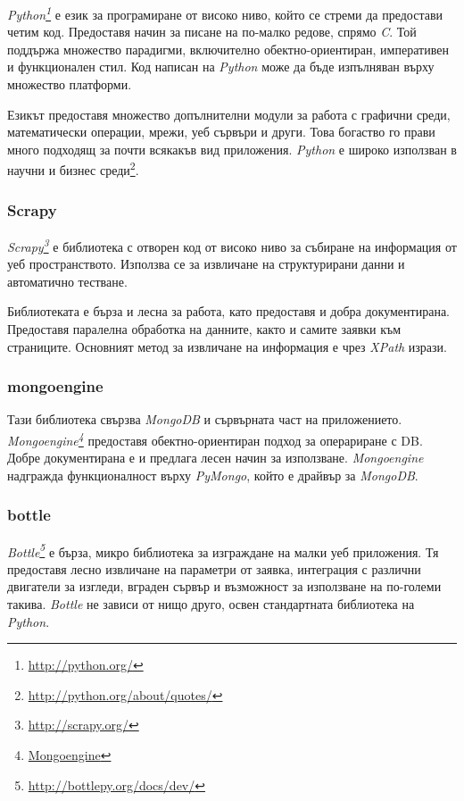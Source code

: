 		\emph{Python\footnote{\url{http://python.org/}}} е език за програмиране от високо ниво, който се стреми да предостави четим код. Предоставя начин за писане на по-малко редове, спрямо \emph{C}. Той поддържа множество парадигми, включително обектно-ориентиран, императивен и функционален стил. Код написан на \emph{Python} може да бъде изпълняван върху множество платформи. 
		
		Езикът предоставя множество допълнителни модули за работа с графични среди, математически операции, мрежи, уеб сървъри и други. Това богаство го прави много подходящ за почти всякакъв вид приложения. \emph{Python} е широко използван в научни и бизнес среди\footnote{\url{http://python.org/about/quotes/}}.
		
		\subsubsection{Scrapy}

		\emph{Scrapy\footnote{\url{http://scrapy.org/}}} е библиотека с отворен код от високо ниво за събиране на информация от уеб пространството. Използва се за извличане на структурирани данни и автоматично тестване.
		
		Библиотеката е бърза и лесна за работа, като предоставя и добра документирана. Предоставя паралелна обработка на данните, както и самите заявки към страниците. Основният метод за извличане на информация е чрез \emph{XPath} изрази.
		
		\subsubsection{mongoengine}

		Тази библиотека свързва \emph{MongoDB} и сървърната част на приложението. \emph{Mongoengine\footnote{\url{Mongoengine}}} предоставя обектно-ориентиран подход за операриране с \ac{DB}. Добре документирана е и предлага лесен начин за използване. \emph{Mongoengine} надгражда функционалност върху \emph{PyMongo}, който е драйвър за \emph{MongoDB}.
		
		\subsubsection{bottle}

		\emph{Bottle\footnote{\url{http://bottlepy.org/docs/dev/}}} е бърза, микро библиотека за изграждане на малки уеб приложения. Тя предоставя лесно извличане на параметри от заявка, интеграция с различни двигатели за изгледи, вграден сървър и възможност за използване на по-големи такива. \emph{Bottle} не зависи от нищо друго, освен стандартната библиотека на \emph{Python}. 
		
